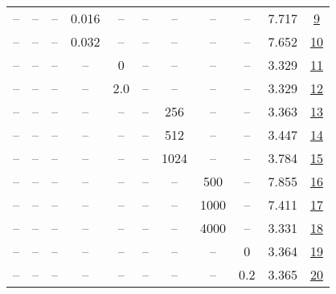 \begin{table}[H]
\begin{tabular}{ccccccccccc}
-- & -- & -- & 0.016 & -- & -- & -- & -- & -- & 7.717 & \href{https://wandb.ai/stanford-mercury/optimizer-scaling/runs/sweep-130m-10B-mini76c7dflr0.016-wd0.1-minlr0-warmup2000-b10.9-b-42ab2c}{9} \\
-- & -- & -- & 0.032 & -- & -- & -- & -- & -- & 7.652 & \href{https://wandb.ai/stanford-mercury/optimizer-scaling/runs/sweep-130m-10B-mini7491aelr0.032-wd0.1-minlr0-warmup2000-b10.9-b-eec75e}{10} \\
-- & -- & -- & -- & 0 & -- & -- & -- & -- & 3.329 & \href{https://wandb.ai/stanford-mercury/optimizer-scaling/runs/sweep-130m-10B-minif4de6alr0.008-wd0.1-minlr0-warmup2000-b10.9-b-8231f8}{11} \\
-- & -- & -- & -- & 2.0 & -- & -- & -- & -- & 3.329 & \href{https://wandb.ai/stanford-mercury/optimizer-scaling/runs/sweep-130m-10B-minifd3dbflr0.008-wd0.1-minlr0-warmup2000-b10.9-b-06509e}{12} \\
-- & -- & -- & -- & -- & -- & 256 & -- & -- & 3.363 & \href{https://wandb.ai/stanford-mercury/optimizer-scaling/runs/sweep-130m-10B-mini5a8324lr0.008-wd0.1-minlr0-warmup2000-b10.9-b-b209a4}{13} \\
-- & -- & -- & -- & -- & -- & 512 & -- & -- & 3.447 & \href{https://wandb.ai/stanford-mercury/optimizer-scaling/runs/sweep-130m-10B-mini845331lr0.008-wd0.1-minlr0-warmup2000-b10.9-b-d5fe03}{14} \\
-- & -- & -- & -- & -- & -- & 1024 & -- & -- & 3.784 & \href{https://wandb.ai/stanford-mercury/optimizer-scaling/runs/sweep-130m-10B-mini3fca05lr0.008-wd0.1-minlr0-warmup2000-b10.9-b-a825c0}{15} \\
-- & -- & -- & -- & -- & -- & -- & 500 & -- & 7.855 & \href{https://wandb.ai/stanford-mercury/optimizer-scaling/runs/sweep-130m-10B-minio76dae9lr0.008-wd0.1-minlr0-warmup500-b10.9-b-134f1f}{16} \\
-- & -- & -- & -- & -- & -- & -- & 1000 & -- & 7.411 & \href{https://wandb.ai/stanford-mercury/optimizer-scaling/runs/sweep-130m-10B-mini684316lr0.008-wd0.1-minlr0-warmup1000-b10.9-b-419ffe}{17} \\
-- & -- & -- & -- & -- & -- & -- & 4000 & -- & 3.331 & \href{https://wandb.ai/stanford-mercury/optimizer-scaling/runs/sweep-130m-10B-mini48c902lr0.008-wd0.1-minlr0-warmup4000-b10.9-b-c9d5f8}{18} \\
-- & -- & -- & -- & -- & -- & -- & -- & 0 & 3.364 & \href{https://wandb.ai/stanford-mercury/optimizer-scaling/runs/sweep-130m-10B-mini774178lr0.008-wd0-minlr0-warmup2000-b10.9-b20-1ab0b9}{19} \\
-- & -- & -- & -- & -- & -- & -- & -- & 0.2 & 3.365 & \href{https://wandb.ai/stanford-mercury/optimizer-scaling/runs/sweep-130m-10B-minic5c69blr0.008-wd0.2-minlr0-warmup2000-b10.9-b-0638b6}{20} \\
\bottomrule
\end{tabular}
\end{table}

